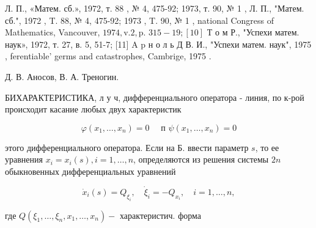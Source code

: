 \documentclass[10pt]{article}
\begin{document}
Л. П., «Матем. сб.», 1972, т. 88 , № 4, 475-92; 1973, т. 90, № 1 , Л. П., "Матем. сб.", 1972 , T. 88, № 4, 475-92; 1973 , T. 90, № 1 , national Congress of Mathematics, Vancouver, $1974, \mathrm{v} .2, \mathrm{p}$. $315-19 ;[10]$ Т о м Р., "Успехи матем. наук», 1972, т. 27, в. 5, 51-7; [11] A p н о л ь Д В. И., "Успехи матем. наук", 1975 , ferentiable' germs and catastrophes, Cambrige, 1975 .



Д. В. Аносов, В. А. Треногин.



БИХАРАКТЕРИСТИКА, л у ч, дифференциального оператора - линия, по к-рой происходит касание любых двух характеристик



\[

\varphi\left(x_{1}, \ldots, x_{n}\right)=0 \quad \text { п } \psi\left(x_{1}, \ldots, x_{n}\right)=0

\]



этого дифференциального оператора. Если на Б. ввести параметр $s$, то ее уравнения $x_{i}=x_{i}(s), i=1, \ldots, n$, определяются из решения системы $2 n$ обыкновенных дифференциальных уравнений



\[

\dot{x}_{i}(s)=Q_{\xi_{i}}, \quad \dot{\xi}_{i}=-Q_{x_{i}}, \quad i=1, \ldots, n,

\]



где $Q\left(\xi_{1}, \ldots, \xi_{n}, x_{1}, \ldots, x_{n}\right)-$ характеристич. форма
\end{document}
